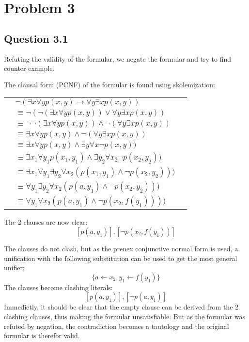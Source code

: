 \newpage
\section*{Problem 3}

\subsection*{Question 3.1}
Refuting the validity of the formular, we negate the formular and try to find counter example.

The clausal form (PCNF) of the formular is found using skolemization:

\begin{center}
    \begin{tabular}{ clr }
        & $\neg (\exists x \forall y p(x,y) \to \forall y \exists x p(x,y))$ \\
        & $\equiv \neg (\neg (\exists x \forall y p(x,y)) \lor \forall y \exists x p(x,y) )$ \\ 
        & $\equiv \neg \neg (\exists x \forall y p(x,y)) \land \neg (\forall y \exists x p(x,y))$ \\ 
        & $\equiv \exists x \forall y p(x,y) \land \neg (\forall y \exists x p(x,y))$ \\ 
        & $\equiv \exists x \forall y p(x,y) \land \exists y \forall x \neg p(x,y))$ \\
        & $\equiv \exists x_1 \forall y_1 p(x_1,y_1) \land \exists y_2 \forall x_2 \neg p(x_2,y_2))$ \\
        & $\equiv \exists x_1 \forall y_1 \exists y_2 \forall x_2 (p(x_1,y_1) \land \neg p(x_2,y_2)))$ \\
        & $\equiv \forall y_1 \exists y_2 \forall x_2 (p(a,y_1) \land \neg p(x_2,y_2)))$ \\
        & $\equiv \forall y_1 \forall x_2 (p(a,y_1) \land \neg p(x_2,f(y_1))))$ \\
    \end{tabular}
\end{center}
The 2 clauses are now clear:
$$[p(a,y_1)] , [\neg p(x_2, f(y_1))]$$

The clauses do not clash, but as the prenex conjunctive normal form is used, a unification with the following substitution can be used to get the most general unifier:
$$\{ a \leftarrow x_2, y_1 \leftarrow f(y_1) \}$$
The clauses become clashing literals:
$$[p(a, y_1)] , [\neg p(a, y_1)]$$
Immedietly, it should be clear that the empty clause can be derived from the 2 clashing clauses, thus making the formular unsatisfiable.
But as the formular was refuted by negation, the contradiction becomes a tautology and the original formular is therefor valid.

